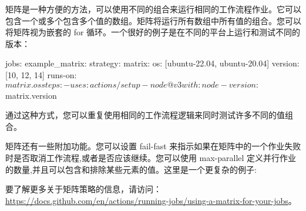 矩阵是一种方便的方法，可以使用不同的组合来运行相同的工作流程作业。它可以包含一个或多个包含多个值的数组。矩阵将运行所有数组中所有值的组合。您可以将矩阵视为嵌套的 for 循环。一个很好的例子是在不同的平台上运行和测试不同的版本：

\begin{shell}
jobs:
  example_matrix:
    strategy:
      matrix:
        os: [ubuntu-22.04, ubuntu-20.04]
        version: [10, 12, 14]
    runs-on: ${{ matrix.os }}
    steps:
      - uses: actions/setup-node@v3
      with:
        node-version: ${{ matrix.version }}
\end{shell}

通过这种方式，您可以重复使用相同的工作流程逻辑来同时测试许多不同的值组合。


矩阵还有一些附加功能。您可以设置 fail-fast 来指示如果在矩阵中的一个作业失败时是否取消工作流程,或者是否应该继续。您可以使用 max-parallel 定义并行作业的数量,并且可以包含和排除某些元素的值。这里是一个更复杂的例子:


要了解更多关于矩阵策略的信息，请访问：\url{https://docs.github.com/en/actions/running-jobs/using-a-matrix-for-your-jobs}。















